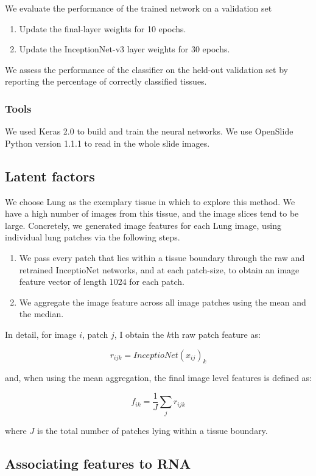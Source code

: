 \documentclass[graybox]{svmult}
\begin{document}
We evaluate the performance of the trained network on a validation set
\begin{enumerate}
 \item Update the final-layer weights for 10 epochs.
 \item Update the InceptionNet-v3 layer weights for 30 epochs.
\end{enumerate}

We assess the performance of the classifier on the held-out validation set by reporting the percentage of correctly classified tissues.

\subsubsection{Tools}
We used Keras 2.0 \cite{keras} to build and train the neural networks. We use OpenSlide Python \cite{openslide} version 1.1.1 to read in the whole slide images.

\subsection{Latent factors}

We choose Lung as the exemplary tissue in which to explore this method. We have a high number of images from this tissue, and the image slices tend to be large. Concretely, we generated image features for each Lung image, using individual lung patches via the following steps.

\begin{enumerate}
\item We pass every patch that lies within a tissue boundary through the raw and retrained InceptioNet networks, and at each patch-size, to obtain an image feature vector of length $1024$ for each patch.
 \item We aggregate the image feature across all image patches using the mean and the median.
\end{enumerate}
In detail, for image $i$, patch $j$, I obtain the $k$th raw patch feature as:

$$r_{ijk} =  InceptioNet(x_{ij})_k$$

and, when using the mean aggregation, the final image level features is defined as:

$$f_{ik} = \frac{1}{J}\sum_j r_{ijk}$$

where $J$ is the total number of patches lying within a tissue boundary.

\subsection{Associating features to RNA}
\end{document}
